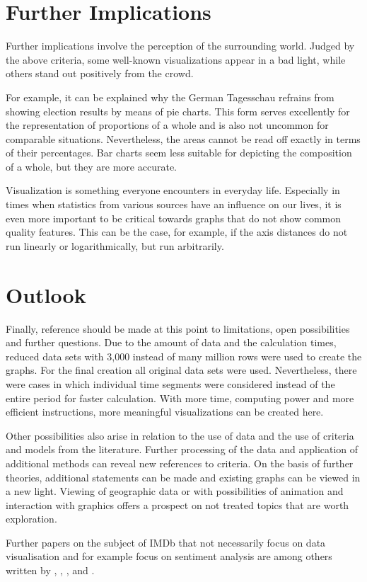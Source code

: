 \section{Further Implications}

Further implications involve the perception of the surrounding world. Judged by the above criteria, some well-known visualizations appear in a bad light, while others stand out positively from the crowd.

For example, it can be explained why the German Tagesschau refrains from showing election results by means of pie charts. This form serves excellently for the representation of proportions of a whole and is also not uncommon for comparable situations. Nevertheless, the areas cannot be read off exactly in terms of their percentages. Bar charts seem less suitable for depicting the composition of a whole, but they are more accurate.

Visualization is something everyone encounters in everyday life. Especially in times when statistics from various sources have an influence on our lives, it is even more important to be critical towards graphs that do not show common quality features. This can be the case, for example, if the axis distances do not run linearly or logarithmically, but run arbitrarily.

\section{Outlook}

Finally, reference should be made at this point to limitations, open possibilities and further questions. Due to the amount of data and the calculation times, reduced data sets with 3,000 instead of many million rows were used to create the graphs. For the final creation all original data sets were used. Nevertheless, there were cases in which individual time segments were considered instead of the entire period for faster calculation. With more time, computing power and more efficient instructions, more meaningful visualizations can be created here.

Other possibilities also arise in relation to the use of data and the use of criteria and models from the literature. Further processing of the data and application of additional methods can reveal new references to criteria. On the basis of further theories, additional statements can be made and existing graphs can be viewed in a new light. Viewing of geographic data or with possibilities of animation and interaction with graphics offers a prospect on not treated topics that are worth exploration.

Further papers on the subject of IMDb that not necessarily focus on data visualisation and for example focus on sentiment analysis are among others written by \cite{dodds2006}, \cite{kumar2019}, \cite{oghina2012}, \cite{yenter2017} and \cite{otterbacher2012}.